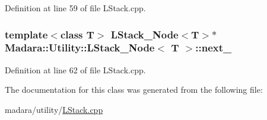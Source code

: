 Definition at line 59 of file LStack.cpp.

\hypertarget{classMadara_1_1Utility_1_1LStack__Node_a37a81a0b974d4b5858c1c3bcb08af2a6}{
\subsubsection[{next\_\-}]{\setlength{\rightskip}{0pt plus 5cm}template$<$class T$>$ {\bf LStack\_\-Node}$<$T$>$$\ast$ {\bf Madara::Utility::LStack\_\-Node}$<$ T $>$::{\bf next\_\-}}}
\label{d6/dc5/classMadara_1_1Utility_1_1LStack__Node_a37a81a0b974d4b5858c1c3bcb08af2a6}


Definition at line 62 of file LStack.cpp.



The documentation for this class was generated from the following file:\begin{DoxyCompactItemize}
\item 
madara/utility/\hyperlink{LStack_8cpp}{LStack.cpp}\end{DoxyCompactItemize}
